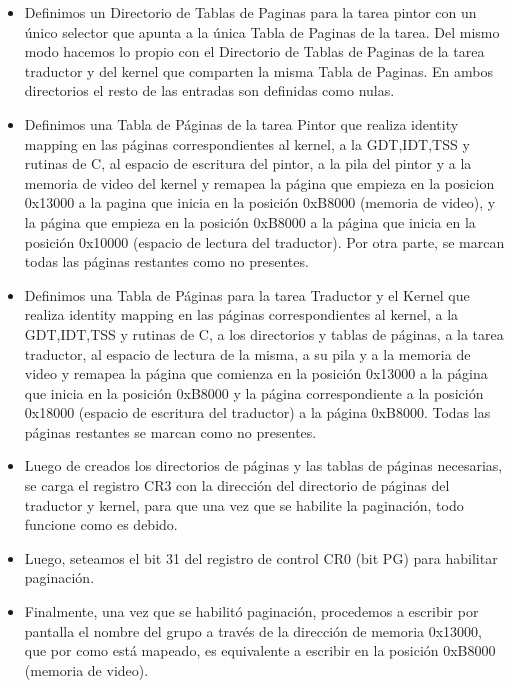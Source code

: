\begin{itemize}
 \item Definimos un Directorio de Tablas de Paginas para la tarea pintor con un \'unico selector que apunta a la \'unica Tabla de Paginas de la tarea. Del mismo modo hacemos lo propio con el Directorio de Tablas de Paginas de la tarea traductor y del kernel que comparten la misma Tabla de Paginas. En ambos directorios el resto de las entradas son definidas como nulas.
 \item Definimos una Tabla de P\'aginas de la tarea Pintor que realiza identity mapping en las p\'aginas correspondientes al kernel, a la GDT,IDT,TSS y rutinas de C, al espacio de escritura del pintor, a la pila del pintor y a la memoria de video del kernel y remapea la p\'agina que empieza en la posicion 0x13000 a la pagina que inicia en la posici\'on 0xB8000 (memoria de video), y la p\'agina que empieza en la posici\'on 0xB8000 a la p\'agina que inicia en la posici\'on 0x10000 (espacio de lectura del traductor). Por otra parte, se marcan todas las p\'aginas restantes como no presentes.
 \item Definimos una Tabla de P\'aginas para la tarea Traductor y el Kernel que realiza identity mapping en las p\'aginas correspondientes al kernel, a la GDT,IDT,TSS y rutinas de C, a los directorios y tablas de p\'aginas, a la tarea traductor, al espacio de lectura de la misma, a su pila y a la memoria de video y remapea la p\'agina que comienza en la posici\'on 0x13000 a la p\'agina que inicia en la posici\'on 0xB8000 y la p\'agina correspondiente a la posici\'on 0x18000 (espacio de escritura del traductor) a la p\'agina 0xB8000. Todas las p\'aginas restantes se marcan como no presentes.
 \item Luego de creados los directorios de p\'aginas y las tablas de p\'aginas necesarias, se carga el registro CR3 con la direcci\'on del directorio de p\'aginas del traductor y kernel, para que una vez que se habilite la paginaci\'on, todo funcione como es debido.
 \item Luego, seteamos el bit 31 del registro de control CR0 (bit PG) para habilitar paginaci\'on.
 \item Finalmente, una vez que se habilit\'o paginaci\'on, procedemos a escribir por pantalla el nombre del grupo a trav\'es de la direcci\'on de memoria 0x13000, que por como est\'a mapeado, es equivalente a escribir en la posici\'on 0xB8000 (memoria de video).
\end{itemize}

